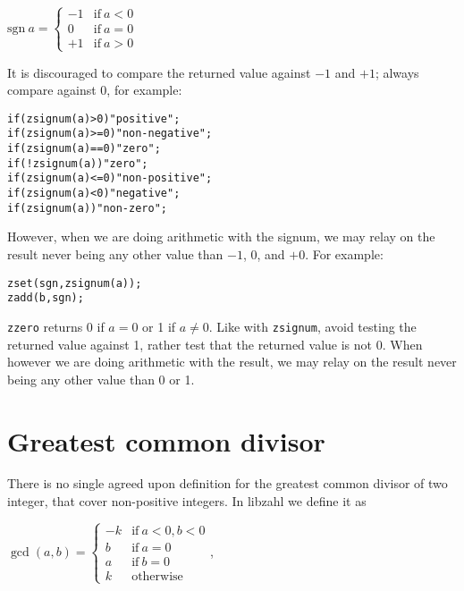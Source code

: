 \vspace{1em}
\( \displaystyle{
    \mbox{sgn}~a = \left \lbrace \begin{array}{rl}
        -1 & \textrm{if}~ a < 0 \\
         0 & \textrm{if}~ a = 0 \\
        +1 & \textrm{if}~ a > 0
    \end{array} \right .
}\)
\vspace{1em}

\noindent
It is discouraged to compare the returned value
against $-1$ and $+1$; always compare against 0,
for example:

\begin{alltt}
   if (zsignum(a) >  0)  "positive";
   if (zsignum(a) >= 0)  "non-negative";
   if (zsignum(a) == 0)  "zero";
   if (!zsignum(a))      "zero";
   if (zsignum(a) <= 0)  "non-positive";
   if (zsignum(a) <  0)  "negative";
   if (zsignum(a))       "non-zero";
\end{alltt}

\noindent
However, when we are doing arithmetic with the
signum, we may relay on the result never being
any other value than $-1$, $0$, and $+0$.
For example:

\begin{alltt}
   zset(sgn, zsignum(a));
   zadd(b, sgn);
\end{alltt}

{\tt zzero} returns 0 if $a = 0$ or 1 if
$a \neq 0$. Like with {\tt zsignum}, avoid
testing the returned value against 1, rather
test that the returned value is not 0. When
however we are doing arithmetic with the
result, we may relay on the result never
being any other value than 0 or 1.


\newpage
\section{Greatest common divisor}
\label{sec:Greatest common divisor}

There is no single agreed upon definition
for the greatest common divisor of two
integer, that cover non-positive integers.
In libzahl we define it as

\vspace{1em}
\( \displaystyle{
    \gcd(a, b) = \left \lbrace \begin{array}{rl}
        -k & \textrm{if}~ a < 0, b < 0 \\
        b  & \textrm{if}~ a = 0 \\
        a  & \textrm{if}~ b = 0 \\
        k  & \textrm{otherwise}
    \end{array} \right .
}\),
\vspace{1em}

